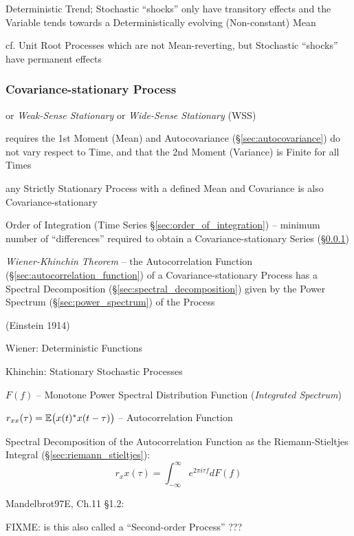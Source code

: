 Deterministic Trend; Stochastic ``shocks'' only have transitory effects and the
Variable tends towards a Deterministically evolving (Non-constant) Mean

cf. Unit Root Processes which are not Mean-reverting, but Stochastic ``shocks''
have permanent effects



\subsubsection{Covariance-stationary Process}\label{sec:covariance_stationary}

or \emph{Weak-Sense Stationary} or \emph{Wide-Sense Stationary} (WSS)

requires the 1st Moment (Mean) and Autocovariance (\S\ref{sec:autocovariance})
do not vary respect to Time, and that the 2nd Moment (Variance) is Finite for
all Times

any Strictly Stationary Process with a defined Mean and Covariance is also
Covariance-stationary

\fist Order of Integration (Time Series \S\ref{sec:order_of_integration}) --
minimum number of ``differences'' required to obtain a Covariance-stationary
Series (\S\ref{sec:covariance_stationary})

\emph{Wiener-Khinchin Theorem} -- the Autocorrelation Function
(\S\ref{sec:autocorrelation_function}) of a Covariance-stationary Process has a
Spectral Decomposition (\S\ref{sec:spectral_decomposition}) given by the Power
Spectrum (\S\ref{sec:power_spectrum}) of the Process

(Einstein 1914)

Wiener: Deterministic Functions

Khinchin: Stationary Stochastic Processes

$F(f)$ -- Monotone Power Spectral Distribution Function
(\emph{Integrated Spectrum})

$r_{xx}(\tau) = \mathbb{E}\big(x(t)^* x(t - \tau)\big)$ -- Autocorrelation Function

Spectral Decomposition of the Autocorrelation Function as the Riemann-Stieltjes
Integral (\S\ref{sec:riemann_stieltjes}):
\[
  r_xx(\tau) = \int_{-\infty}^\infty e^{2\pi i\tau f} dF(f)
\]

Mandelbrot97E, Ch.11 \S 1.2:

FIXME: is this also called a ``Second-order Process'' ???

